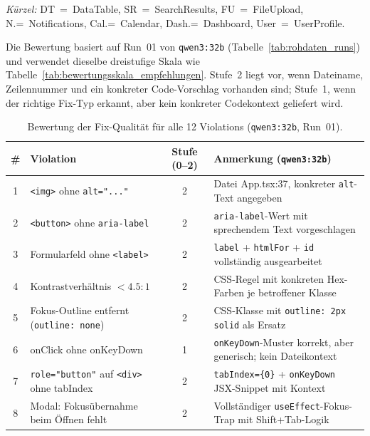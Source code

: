 \clearpage

\label{app:empfehlungsqualitaet_12}

\noindent\textit{Kürzel:} DT~=~DataTable, SR~=~SearchResults, FU~=~FileUpload, N.=~Notifications, Cal.=~Calendar, Dash.=~Dashboard, User~=~UserProfile.

Die Bewertung basiert auf Run~01 von \texttt{qwen3:32b} (Tabelle~\ref{tab:rohdaten_runs}) und verwendet dieselbe dreistufige Skala wie Tabelle~\ref{tab:bewertungsskala_empfehlungen}. Stufe~2 liegt vor, wenn Dateiname, Zeilennummer und ein konkreter Code-Vorschlag vorhanden sind; Stufe~1, wenn der richtige Fix-Typ erkannt, aber kein konkreter Codekontext geliefert wird.

\begin{table}[htbp]
\centering
\setlength{\tabcolsep}{3.5pt}
\renewcommand{\arraystretch}{1.2}
\caption[Empfehlungsqualität (test-12)]{Bewertung der Fix-Qualität für alle 12 Violations (\texttt{qwen3:32b}, Run~01).}
\begin{tabular}{|c|p{4.8cm}|c|p{5.2cm}|}
\hline
\textbf{\#} & \textbf{Violation} & \textbf{Stufe (0--2)} & \textbf{Anmerkung (\texttt{qwen3:32b})} \\
\hline
1 & \texttt{<img>} ohne \texttt{alt="..."} & 2 & Datei App.tsx:37, konkreter \texttt{alt}-Text angegeben \\
\hline
2 & \texttt{<button>} ohne \texttt{aria-label} & 2 & \texttt{aria-label}-Wert mit sprechendem Text vorgeschlagen \\
\hline
3 & Formularfeld ohne \texttt{<label>} & 2 & \texttt{label} + \texttt{htmlFor} + \texttt{id} vollständig ausgearbeitet \\
\hline
4 & Kontrastverhältnis $< 4.5:1$ & 2 & \ac{CSS}-Regel mit konkreten Hex-Farben je betroffener Klasse \\
\hline
5 & Fokus-Outline entfernt (\texttt{outline: none}) & 2 & \ac{CSS}-Klasse mit \texttt{outline: 2px solid} als Ersatz \\
\hline
6 & onClick ohne onKeyDown & 1 & \texttt{onKeyDown}-Muster korrekt, aber generisch; kein Dateikontext \\
\hline
7 & \texttt{role="button"} auf \texttt{<div>} ohne tabIndex & 2 & \texttt{tabIndex=\{0\}} + \texttt{onKeyDown} \ac{JSX}-Snippet mit Kontext \\
\hline
8 & Modal: Fokusübernahme beim Öffnen fehlt & 2 & Vollständiger \texttt{useEffect}-Fokus-Trap mit Shift+Tab-Logik \\

\end{tabular}
\end{table}
